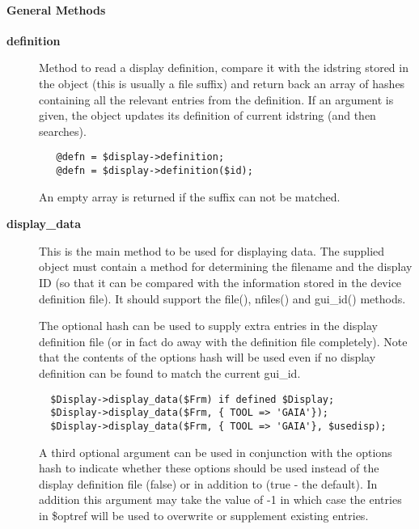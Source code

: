 \paragraph*{General Methods\label{ORAC::Display_General_Methods}}
\begin{description}

\item[{\textbf{definition}}] \mbox{}

Method to read a display definition, compare it with the idstring
stored in the object (this is usually a file suffix)
and return back an array of  hashes containing all the relevant entries
from the definition. If an argument is given, the object updates
its definition of current idstring (and then searches).

\begin{verbatim}
   @defn = $display->definition;
   @defn = $display->definition($id);
\end{verbatim}


An empty array is returned if the suffix can not be matched.


\item[{\textbf{display\_data}}] \mbox{}

This is the main method to be used for displaying data.  The supplied
object must contain a method for determining the filename and the
display ID (so that it can be compared with the information stored in
the device definition file). It should support the file(), nfiles()
and gui\_id() methods.



The optional hash can be used to supply extra entries in the
display definition file (or in fact do away with the definition file
completely). Note that the contents of the options hash will be used
even if no display definition can be found to match the current
gui\_id.

\begin{verbatim}
  $Display->display_data($Frm) if defined $Display;
  $Display->display_data($Frm, { TOOL => 'GAIA'});
  $Display->display_data($Frm, { TOOL => 'GAIA'}, $usedisp);
\end{verbatim}


A third optional argument can be used in conjunction with the options
hash to indicate whether these options should be used instead of the
display definition file (false) or in addition to (true - the
default). In addition this argument may take the value of -1 in which
case the entries in \$optref will be used to overwrite or supplement
existing entries.



\end{description}
